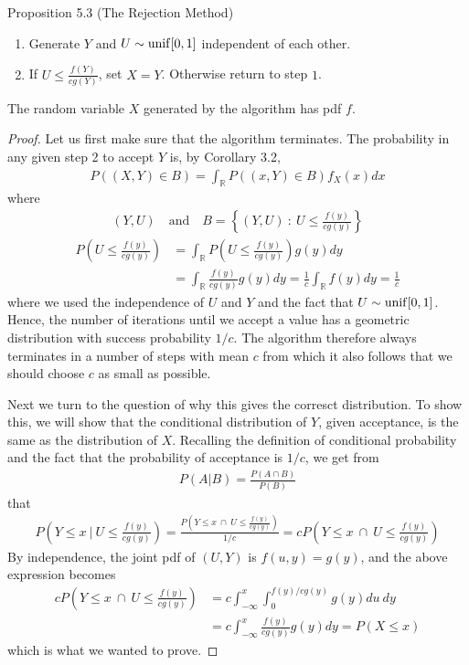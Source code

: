 \begin{boks}{Proposition 5.3 (The Rejection Method)}
  \begin{enumerate}[label = \arabic*.]
    \item Generate $Y$ and $U \sim \operatorname{unif}[0,1]$ independent of each other.
    \item If $U \leq \frac{f(Y)}{cg(Y)}$, set $X = Y$. Otherwise return to step $1$.
  \end{enumerate}
  The random variable $X$ generated by the algorithm has pdf $f$.
\end{boks}
\begin{proof}
  Let us first make sure that the algorithm terminates. The probability in any given step 2 to accept $Y$ is, by Corollary 3.2,
  \begin{align*}
    P((X, Y) \in B) = \int_{\mathbb{R}} P((x, Y) \in B)f_X(x) dx
  \end{align*}
  where
  \begin{align*}
    (Y, U) \quad \text{and} \quad B = \left\{(Y, U) \ : \ U \leq \frac{f(y)}{cg(y)}\right\}
  \end{align*}
  \begin{align*}
    P\left( U \leq \frac{f(y)}{cg(y)} \right) &=
    \int_{\mathbb{R}} P\left( U \leq \frac{f(y)}{cg(y)} \right) g(y)dy \\
    &= \int_{\mathbb{R}} \frac{f(y)}{cg(y)} g(y)dy =
    \frac{1}{c}\int_\mathbb{R}f(y)dy =
    \frac{1}{c}
  \end{align*}
  where we used the independence of $U$ and $Y$ and the fact that $U \sim \operatorname{unif}[0,1]$. Hence, the number of iterations until we accept a value has a geometric distribution with success probability $1/c$. The algorithm therefore always terminates in a number of steps with mean $c$ from which it also follows that we should choose $c$ as small as possible.

  Next we turn to the question of why this gives the corresct distribution. To show this, we will show that the conditional distribution of $Y$, given acceptance, is the same as the distribution of $X$. Recalling the definition of conditional probability and the fact that the probability of acceptance is $1/c$, we get from
  \begin{align*}
    P(A|B) = \frac{P(A \cap B)}{P(B)}
  \end{align*}
  that
  \begin{align*}
    P\left(Y \leq x \ \bigg| \ U \leq \frac{f(y)}{cg(y)} \right) =
    \frac{P\left(Y \leq x \ \cap \ U \leq \frac{f(y)}{cg(y)}\right)}{1/c} = cP\left(Y \leq x \ \cap \ U \leq \frac{f(y)}{cg(y)}\right)
  \end{align*}
  By independence, the joint pdf of $(U, Y)$ is $f(u,y) = g(y)$, and the above expression becomes
  \begin{align*}
    cP\left(Y \leq x \ \cap \ U \leq \frac{f(y)}{cg(y)}\right) &= c \int_{-\infty}^x \int_0^{f(y)/cg(y)} g(y)du \ dy \\
    &= c \int_{-\infty}^x \frac{f(y)}{cg(y)}g(y)dy = P(X \leq x)
  \end{align*}
  which is what we wanted to prove.
\end{proof}

